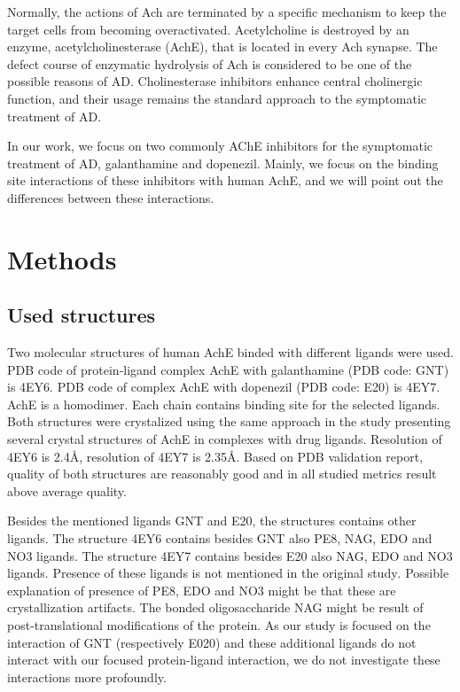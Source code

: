 \documentclass[10pt,a4paper,twocolumn]{article}
\begin{document}
Normally, the actions of Ach are terminated by a specific mechanism 
to keep the target cells from becoming overactivated. Acetylcholine is 
destroyed by an enzyme\textsuperscript{\cite{KOMERSOVA2005387}}, 
acetylcholinesterase (AchE), that is located in every 
Ach synapse. The defect course of enzymatic hydrolysis of 
Ach is considered to be one of the possible reasons of 
AD\textsuperscript{\cite{KOMERSOVA2005387}}. 
Cholinesterase inhibitors enhance central cholinergic 
function, and their usage remains the standard approach to the symptomatic 
treatment of AD\textsuperscript{\cite{grossberg2003cholinesterase}}.

In our work, we focus on two commonly AChE inhibitors for the symptomatic 
treatment of AD, galanthamine and dopenezil. Mainly, we focus on the binding site
interactions of these inhibitors with human AchE, and we will point out the 
differences between these interactions.



\section*{Methods}

\subsection*{Used structures}
Two molecular structures of human AchE binded with different ligands were 
used. PDB code of protein-ligand complex AchE with galanthamine 
(PDB code: GNT) is 4EY6. PDB code of complex AchE with dopenezil 
(PDB code: E20) is 4EY7. AchE is a homodimer. Each chain contains 
binding site for the selected ligands. Both structures were crystalized
using the same approach in the study presenting several crystal 
structures of AchE in complexes with drug 
ligands\textsuperscript{\cite{doi:10.1021/jm300871x}}. Resolution of 
4EY6 is 2.4\AA, resolution of 4EY7 is 2.35\AA. Based on PDB validation
report, quality of both structures are reasonably good and in all studied
metrics result above average quality.

Besides the mentioned ligands GNT and E20, the structures contains other ligands.
The structure 4EY6 contains besides GNT also PE8, NAG, EDO and NO3 ligands. 
The structure 4EY7 contains besides E20 also NAG, EDO and NO3 ligands. Presence 
of these ligands is not mentioned in the original 
study\textsuperscript{\cite{doi:10.1021/jm300871x}}. Possible explanation of 
presence of PE8, EDO and NO3 might be that these are crystallization artifacts.
The bonded oligosaccharide NAG might be result of post-translational 
modifications of the protein. As our study is focused on the interaction of GNT 
(respectively E020) and these additional ligands do not interact with our focused
protein-ligand interaction, we do not investigate these interactions more profoundly.
\end{document}
